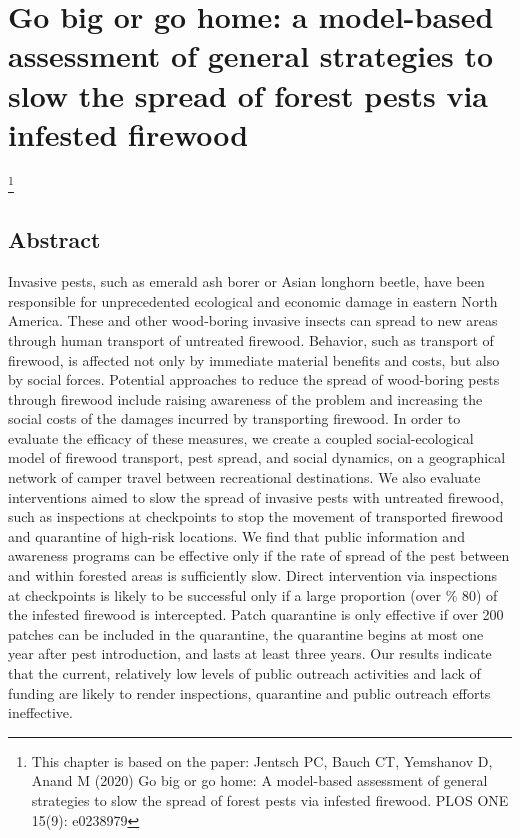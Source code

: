\chapter{Go big or go home: a model-based assessment of general strategies to slow the spread of forest pests via infested firewood}
\label{firewoodmodel}
\let\thefootnote\relax\footnote{This chapter is based on the paper: Jentsch PC, Bauch CT, Yemshanov D, Anand M (2020) Go big or go home: A model-based assessment of general strategies to slow the spread of forest pests via infested firewood. PLOS ONE 15(9): e0238979}
\vspace*{0.2in}

\section{Abstract}
Invasive pests, such as emerald ash borer or Asian longhorn beetle, have been responsible for unprecedented ecological and economic damage in eastern North America. These and other wood-boring invasive insects can spread to new areas through human transport of untreated firewood. Behavior, such as transport of firewood, is affected not only by immediate material benefits and costs, but also by social forces. Potential approaches to reduce the spread of wood-boring pests through firewood include raising awareness of the problem and increasing the social costs of the damages incurred by transporting firewood. In order to evaluate the efficacy of these measures, we create a coupled social-ecological model of firewood transport, pest spread, and social dynamics, on a geographical network of camper travel between recreational destinations. We also evaluate interventions aimed to slow the spread of invasive pests with untreated firewood, such as inspections at checkpoints to stop the movement of transported firewood and quarantine of high-risk locations. We find that public information and awareness programs can be effective only if the rate of spread of the pest between and within forested areas is sufficiently slow. Direct intervention via inspections at checkpoints is likely to be successful only if a large proportion (over \% 80) of the infested firewood is intercepted. Patch quarantine is only effective if over 200 patches can be included in the quarantine, the quarantine begins at most one year after pest introduction, and lasts at least three years. Our results indicate that the current, relatively low levels of public outreach activities and lack of funding are likely to render inspections, quarantine and public outreach efforts ineffective.

